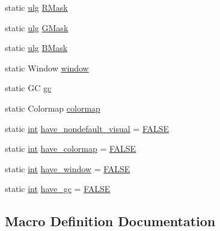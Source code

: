 \begin{DoxyCompactItemize}
\item 
static \mbox{\hyperlink{readpng_8h_abd6f60bf9450af2ecb94097a32c19a64}{ulg}} \mbox{\hyperlink{rpng-x_8c_a212e4ea41130e09c64e370b2bb342724}{R\+Mask}}
\item 
static \mbox{\hyperlink{readpng_8h_abd6f60bf9450af2ecb94097a32c19a64}{ulg}} \mbox{\hyperlink{rpng-x_8c_a2fbd729689ff182bd914481196f3850e}{G\+Mask}}
\item 
static \mbox{\hyperlink{readpng_8h_abd6f60bf9450af2ecb94097a32c19a64}{ulg}} \mbox{\hyperlink{rpng-x_8c_ad1a7f16abbb81ff4ed49b6eb472e9822}{B\+Mask}}
\item 
static Window \mbox{\hyperlink{rpng-x_8c_ac5b0b3c19d476a314bb68af9bc4a0ee0}{window}}
\item 
static GC \mbox{\hyperlink{rpng-x_8c_a5da9d24666f1955a9b5ce3d2583b823a}{gc}}
\item 
static Colormap \mbox{\hyperlink{rpng-x_8c_af611adb2a277a44b745300318b0bbca7}{colormap}}
\item 
static \mbox{\hyperlink{ioapi_8h_a787fa3cf048117ba7123753c1e74fcd6}{int}} \mbox{\hyperlink{rpng-x_8c_a93e94a7490818556d4d9d76a804cc24f}{have\+\_\+nondefault\+\_\+visual}} = \mbox{\hyperlink{pnm2png_8c_aa93f0eb578d23995850d61f7d61c55c1}{F\+A\+L\+SE}}
\item 
static \mbox{\hyperlink{ioapi_8h_a787fa3cf048117ba7123753c1e74fcd6}{int}} \mbox{\hyperlink{rpng-x_8c_ab3e4800c6d7c9fc245408d2f353c323e}{have\+\_\+colormap}} = \mbox{\hyperlink{pnm2png_8c_aa93f0eb578d23995850d61f7d61c55c1}{F\+A\+L\+SE}}
\item 
static \mbox{\hyperlink{ioapi_8h_a787fa3cf048117ba7123753c1e74fcd6}{int}} \mbox{\hyperlink{rpng-x_8c_abc7a59036bc5c12eb5146800de191e77}{have\+\_\+window}} = \mbox{\hyperlink{pnm2png_8c_aa93f0eb578d23995850d61f7d61c55c1}{F\+A\+L\+SE}}
\item 
static \mbox{\hyperlink{ioapi_8h_a787fa3cf048117ba7123753c1e74fcd6}{int}} \mbox{\hyperlink{rpng-x_8c_a5d1f5ec6f862a98b237378772eb5a1c8}{have\+\_\+gc}} = \mbox{\hyperlink{pnm2png_8c_aa93f0eb578d23995850d61f7d61c55c1}{F\+A\+L\+SE}}
\end{DoxyCompactItemize}


\subsection{Macro Definition Documentation}
\mbox{\label{rpng-x_8c_af1fe887e7346a25e71f3b1527e723692}} 
